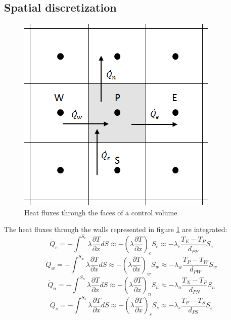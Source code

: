 \subsection{Spatial discretization}
\begin{figure}
	\centering
	\includegraphics[]{FourMaterials/controlvolume2d}
	\caption{Heat fluxes through the faces of a control volume}
	\label{convol2d}
\end{figure}
The heat fluxes through the walls represented in figure \ref{convol2d} are integrated:
\begin{equation}
\dot{Q}_{e}=-\int_{}^{S_{e}}\lambda\frac{\partial T}{\partial x}dS\approx-\left(\lambda\frac{\partial T}{\partial x}\right)_{e}S_{e}\approx-\lambda_{e}\frac{T_{E}-T_{P}}{d_{PE}}S_{e}
\end{equation}
\begin{equation}
\dot{Q}_{w}=-\int_{}^{S_{w}}\lambda\frac{\partial T}{\partial x}dS\approx-\left(\lambda\frac{\partial T}{\partial x}\right)_{w}S_{w}\approx-\lambda_{w}\frac{T_{P}-T_{W}}{d_{PW}}S_{w}
\end{equation}
\begin{equation}
\dot{Q}_{n}=-\int_{}^{S_{n}}\lambda\frac{\partial T}{\partial x}dS\approx-\left(\lambda\frac{\partial T}{\partial x}\right)_{n}S_{n}\approx-\lambda_{n}\frac{T_{N}-T_{P}}{d_{PN}}S_{n}
\end{equation}
\begin{equation}
\dot{Q}_{s}=-\int_{}^{S_{s}}\lambda\frac{\partial T}{\partial x}dS\approx-\left(\lambda\frac{\partial T}{\partial x}\right)_{s}S_{s}\approx-\lambda_{s}\frac{T_{P}-T_{S}}{d_{PS}}S_{s}
\end{equation}
